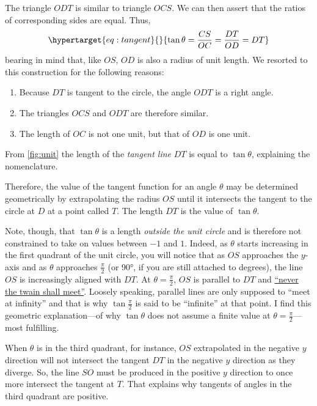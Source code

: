 \documentclass[
  a4paper,
]{article}
\providecommand{\tightlist}{%
  \setlength{\itemsep}{0pt}\setlength{\parskip}{0pt}}
\begin{document}
The triangle \(ODT\) is similar to triangle \(OCS\). We can then assert
that the ratios of corresponding sides are equal. Thus,
\begin{equation}\protect\hypertarget{eq:tangent}{}{
\tan\theta = \frac{CS}{OC} = \frac{DT}{OD} = DT
}\label{eq:tangent}\end{equation} bearing in mind that, like \(OS\),
\(OD\) is also a radius of unit length. We resorted to this construction
for the following reasons:

\begin{enumerate}
\tightlist
\item
  Because \(DT\) is tangent to the circle, the angle \(ODT\) is a right
  angle.
\item
  The triangles \(OCS\) and \(ODT\) are therefore similar.
\item
  The length of \(OC\) is not one unit, but that of \(OD\) is one unit.
\end{enumerate}

From \cref{fig:unit} the length of the \emph{tangent line} \(DT\) is
equal to \(\tan\theta\), explaining the nomenclature.

Therefore, the value of the tangent function for an angle \(\theta\) may
be determined geometrically by extrapolating the radius \(OS\) until it
intersects the tangent to the circle at \(D\) at a point called \(T\).
The length \(DT\) is the value of \(\tan\theta\).

Note, though, that \(\tan\theta\) is a length \emph{outside the unit
circle} and is therefore not constrained to take on values between
\(-1\) and \(1\). Indeed, as \(\theta\) starts increasing in the first
quadrant of the unit circle, you will notice that as \(OS\) approaches
the \(y\)-axis and as \(\theta\) approaches \(\frac{\pi}{2}\) (or 90°,
if you are still attached to degrees), the line \(OS\) is increasingly
aligned with \(DT\). At \(\theta=\frac{\pi}{2}\), \(OS\) is parallel to
\(DT\) and
\href{https://en.wikipedia.org/wiki/The_Ballad_of_East_and_West}{``never
the twain shall meet''}. Loosely speaking, parallel lines are only
supposed to ``meet at infinity'' and that is why \(\tan\frac{\pi}{2}\)
is said to be ``infinite'' at that point. I find this geometric
explanation---of why \(\tan\theta\) does not assume a finite value at
\(\theta=\frac{\pi}{2}\)---most fulfilling.

When \(\theta\) is in the third quadrant, for instance, \(OS\)
extrapolated in the negative \(y\) direction will not intersect the
tangent \(DT\) in the negative \(y\) direction as they diverge. So, the
line \(SO\) must be produced in the positive \(y\) direction to once
more intersect the tangent at \(T\). That explains why tangents of
angles in the third quadrant are positive.
\end{document}
